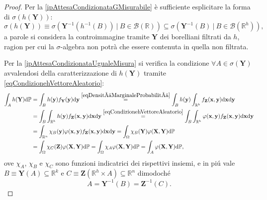         \begin{proof}
            Per la \ref{ipAttesaCondizionataGMisurabile} è sufficiente esplicitare la forma di \(\sigma(h(\mathbf Y))\):
            \[
                \sigma(h(\mathbf Y))
                \equiv\sigma({\mathbf Y^{-1}(h^{-1}(B))\ |\ B\in\mathcal B(\mathbb R)})
                \subseteq\sigma({\mathbf Y^{-1}(B)\ |\ B\in\mathcal B(\mathbb R^h)}),
            \]
            a parole si considera la controimmagine tramite \(\mathbf Y\) dei borelliani filtrati da \(h\), ragion per cui la \(\sigma\)-algebra non potrà che essere contenuta in quella non filtrata.  
            
            Per la \ref{ipAttesaCondizionataUgualeMisura} si verifica la condizione \(\forall A\in\sigma(\mathbf Y)\) avvalendosi della caratterizzazione di \(h(\mathbf Y)\) tramite \eqref{eqCondizionehVettoreAleatorio}:
            \[
                \begin{aligned}
                    \int_Ah(\mathbf Y)\mathrm{d}\mathbb P
                    &=\int_Bh(\mathbf y)f_{\mathbf Y}(\mathbf y)\mathrm{d}\mathbf y
                    \overset{\eqref{eqDensitàMarginaleProbabilità}}{=}
                    \int_Bh(\mathbf y)\int_{\mathbb R^h}f_{\mathbf Z}(\mathbf x,\mathbf y)\mathrm{d}\mathbf x\mathrm{d}\mathbf y
                    \\&=\int_B\int_{\mathbb R^h}h(\mathbf y)f_{\mathbf Z}(\mathbf x,\mathbf y)\mathrm{d}\mathbf x\mathrm{d}\mathbf y
                    \overset{\eqref{eqCondizionehVettoreAleatorio}}{=}
                    \int_B\int_{\mathbb R^h}\varphi(\mathbf x,\mathbf y)f_{\mathbf Z}(\mathbf x,\mathbf y)\mathrm{d}\mathbf x\mathrm{d}\mathbf y
                    \\&=\int_{\mathbb R^n}\chi_B(\mathbf y)\varphi(\mathbf x,\mathbf y)f_{\mathbf Z}(\mathbf x,\mathbf y)\mathrm{d}\mathbf x\mathrm{d}\mathbf y
                    =\int_\Omega\chi_B(\mathbf Y)\varphi(\mathbf X,\mathbf Y)\mathrm{d}\mathbb P
                    \\&=\int_\Omega\chi_C(\mathbf Z)\varphi(\mathbf X,\mathbf Y)\mathrm{d}\mathbb P
                    =\int_\Omega\chi_A\varphi(\mathbf X,\mathbf Y)\mathrm{d}\mathbb P
                    =\int_A\varphi(\mathbf X,\mathbf Y)\mathrm{d}\mathbb P,
                \end{aligned}
            \] %
            ove \(\chi_A\), \(\chi_B\) e \(\chi_C\) sono funzioni indicatrici dei rispettivi insiemi, e in piú vale \(B\equiv\mathbf Y(A)\subseteq\mathbb R^k\) e \(C\equiv\mathbf Z(\mathbb R^h\times A)\subseteq\mathbb R^n\) dimodoché
            \[
                A=\mathbf Y^{-1}(B)=\mathbf Z^{-1}(C).
            \]
        \end{proof}

